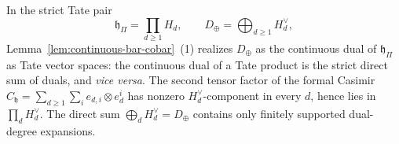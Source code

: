 \begin{rmk}\label{rmk:diagnosis-unweighted-casimir}
  In the strict Tate pair
  \begin{equation}\label{eq:wt-strict-tate-pair}
    \mathfrak h_\Pi=\prod_{d\geq1}H_d,\qquad
    D_\oplus=\bigoplus_{d\geq1}H_d^\vee,
  \end{equation}
  Lemma~\ref{lem:continuous-bar-cobar}~(1) realizes $D_\oplus$ as the
  continuous dual of $\mathfrak h_\Pi$ as Tate vector spaces: the
  continuous dual of a Tate product is the strict direct sum of duals,
  and \emph{vice versa}.  The second tensor factor of the formal Casimir
  $C_{\mathfrak h}=\sum_{d\geq1}\sum_i e_{d,i}\otimes e^i_d$ has nonzero
  $H_d^\vee$-component in every $d$, hence lies in $\prod_d H_d^\vee$.
  The direct sum $\bigoplus_d H_d^\vee=D_\oplus$ contains only finitely
  supported dual-degree expansions.
\end{rmk}

